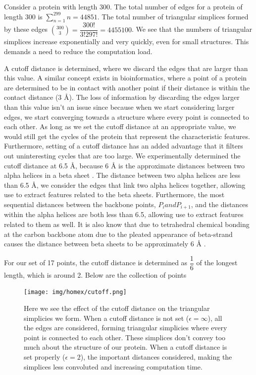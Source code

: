 \documentclass[12pt, a4paper, twocolumn, fullpage]{article}
\theoremstyle{plain}
\theoremstyle{definition}
\theoremstyle{remark}
\begin{document}
Consider a protein with length 300. The total number of edges for a protein of length 300 is $\sum_{n=1}^{299} n =44851$. The total number of triangular simplices formed by these edges $\binom{300}{3}=\dfrac{300!}{3!297!}=4455100$.  We see that the numbers of triangular simplices increase exponentially and very quickly, even for small structures. This demands a need to reduce the computation load.

A cutoff distance is determined, where we discard the edges that are larger than this value. A similar concept exists in bioinformatics, where a point of a protein are determined to be in contact with another point if their distance is within the contact distance (3 Å). The loss of information by discarding the edges larger than this value isn't an issue since because when we start considering larger edges, we start converging towards a structure where every point is connected to each other. As long as we set the cutoff distance at an appropriate value, we would still get the cycles of the protein that represent the characteristic features. Furthermore, setting of a cutoff distance has an added advantage that it filters out uninteresting cycles that are too large. We experimentally determined the cutoff distance at 6.5 Å, because 6 Å is the approximate distances between two alpha helices in a beta sheet \cite{fastSCOP}. The distance between two alpha helices are less than 6.5  Å, we  consider the edges that link two alpha helices together, allowing use to extract features related to the beta sheets. Furthermore, the most sequential distances between the backbone points, $P_i and P_{i+1}$, and the distances within the alpha helices are both less than 6.5, allowing use to extract features related to them as well. It is also know that due to   tetrahedral chemical bonding at the carbon backbone atom due to the pleated appearance of beta-strand causes the distance between beta sheets to be approximately 6 Å \cite{fastSCOP}.

For our set of 17 points, the cutoff distance is determined as $\dfrac{1}{6}$ of the longest length, which is around 2. Below are the collection of points 

\begin{figure}
    \texttt{[image: img/homex/cutoff.png]}
    \caption{Here we see the effect of the cutoff distance on the triangular simplicies we form. When a cutoff distance is not set ($\epsilon=\infty$), all the edges are considered, forming triangular simplicies where every point is connected to each other. These simplices don't convey too much about the structure of our protein. When a cutoff distance is set properly ($\epsilon=2$), the important distances considered, making the simplices less convoluted and increasing computation time.}
    \label{Effect of cutoff}
\end{figure}
\end{document}
